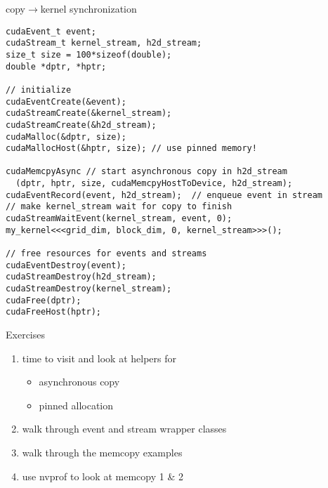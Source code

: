 \begin{frame}[fragile]{}
    \begin{code}{copy$\rightarrow$kernel synchronization}
        \begin{lstlisting}[style=boxcudatiny]
cudaEvent_t event;
cudaStream_t kernel_stream, h2d_stream;
size_t size = 100*sizeof(double);
double *dptr, *hptr;

// initialize
cudaEventCreate(&event);
cudaStreamCreate(&kernel_stream);
cudaStreamCreate(&h2d_stream);
cudaMalloc(&dptr, size);
cudaMallocHost(&hptr, size); // use pinned memory!

cudaMemcpyAsync // start asynchronous copy in h2d_stream
  (dptr, hptr, size, cudaMemcpyHostToDevice, h2d_stream);
cudaEventRecord(event, h2d_stream);  // enqueue event in stream
// make kernel_stream wait for copy to finish
cudaStreamWaitEvent(kernel_stream, event, 0);
my_kernel<<<grid_dim, block_dim, 0, kernel_stream>>>();

// free resources for events and streams
cudaEventDestroy(event);
cudaStreamDestroy(h2d_stream);
cudaStreamDestroy(kernel_stream);
cudaFree(dptr);
cudaFreeHost(hptr);
        \end{lstlisting}
    \end{code}
\end{frame}

\begin{frame}[fragile]{Exercises}
    \begin{enumerate}
        \item time to visit  and look at helpers for
        \begin{itemize}
            \item asynchronous copy
            \item pinned allocation
        \end{itemize}
        \item walk through event and stream wrapper classes
        \item walk through the memcopy examples
        \item use nvprof to look at memcopy 1 \& 2
    \end{enumerate}
\end{frame}

